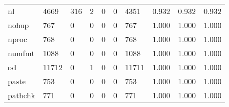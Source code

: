 \begin{longtable}{lp{1.3cm}p{1.3cm}p{1.3cm}p{1.3cm}p{1.3cm}p{1.3cm}p{1.3cm}p{1.3cm}p{1.3cm}}
nl        &                   4669 &                                316 &                                 2 &                                0 &                                 0 &                            4351 &                                0.932 &                                  0.932 &                                0.932 \\
nohup     &                    767 &                                  0 &                                 0 &                                0 &                                 0 &                             767 &                                1.000 &                                  1.000 &                                1.000 \\
nproc     &                    768 &                                  0 &                                 0 &                                0 &                                 0 &                             768 &                                1.000 &                                  1.000 &                                1.000 \\
numfmt    &                   1088 &                                  0 &                                 0 &                                0 &                                 0 &                            1088 &                                1.000 &                                  1.000 &                                1.000 \\
od        &                  11712 &                                  0 &                                 1 &                                0 &                                 0 &                           11711 &                                1.000 &                                  1.000 &                                1.000 \\
paste     &                    753 &                                  0 &                                 0 &                                0 &                                 0 &                             753 &                                1.000 &                                  1.000 &                                1.000 \\
pathchk   &                    771 &                                  0 &                                 0 &                                0 &                                 0 &                             771 &                                1.000 &                                  1.000 &                                1.000 \\

\end{longtable}
